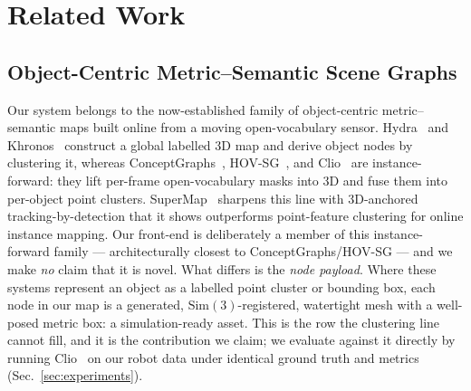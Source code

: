 \documentclass[conference]{IEEEtran}
\begin{document}
\section{Related Work}

\subsection{Object-Centric Metric--Semantic Scene Graphs}
Our system belongs to the now-established family of object-centric
metric--semantic maps built online from a moving open-vocabulary sensor.
Hydra~\cite{hydra} and Khronos~\cite{khronos} construct a global labelled 3D map
and derive object nodes by clustering it, whereas ConceptGraphs~\cite{conceptgraphs},
HOV-SG~\cite{hovsg}, and Clio~\cite{clio} are instance-forward: they lift
per-frame open-vocabulary masks into 3D and fuse them into per-object point
clusters. SuperMap~\cite{supermap} sharpens this line with 3D-anchored
tracking-by-detection that it shows outperforms point-feature clustering for
online instance mapping. Our front-end is deliberately a member of this
instance-forward family --- architecturally closest to
ConceptGraphs/HOV-SG --- and we make \emph{no} claim that it is novel. What
differs is the \emph{node payload}. Where these systems represent an object as a
labelled point cluster or bounding box, each node in our map is a generated,
$\mathrm{Sim}(3)$-registered, watertight mesh with a well-posed metric box: a
simulation-ready asset. This is the row the clustering line cannot fill, and it
is the contribution we claim; we evaluate against it directly by running
Clio~\cite{clio} on our robot data under identical ground truth and metrics
(Sec.~\ref{sec:experiments}).
\end{document}
